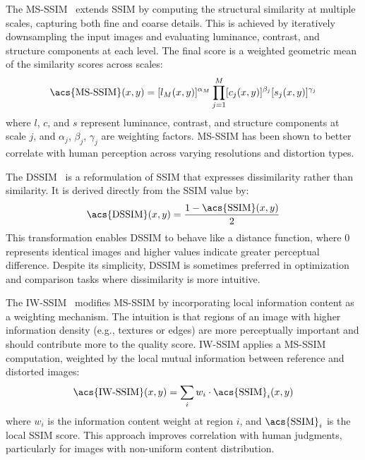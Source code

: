The \acf{MS-SSIM}~\cite{wang2003multiscale} extends \acs{SSIM} by computing the structural similarity at multiple scales, capturing both fine and coarse details. This is achieved by iteratively downsampling the input images and evaluating luminance, contrast, and structure components at each level. The final score is a weighted geometric mean of the similarity scores across scales:
\begin{equation}
\text{\acs{MS-SSIM}}(x, y) = [l_M(x, y)]^{\alpha_M} \prod_{j=1}^{M} [c_j(x, y)]^{\beta_j} [s_j(x, y)]^{\gamma_j}
\end{equation}
where $l$, $c$, and $s$ represent luminance, contrast, and structure components at scale $j$, and $\alpha_j$, $\beta_j$, $\gamma_j$ are weighting factors. \acs{MS-SSIM} has been shown to better correlate with human perception across varying resolutions and distortion types.

The \acf{DSSIM}~\cite{wang2004image} is a reformulation of \acs{SSIM} that expresses dissimilarity rather than similarity. It is derived directly from the \acs{SSIM} value by:
\begin{equation}
\text{\acs{DSSIM}}(x, y) = \frac{1 - \text{\acs{SSIM}}(x, y)}{2}
\end{equation}
This transformation enables \acs{DSSIM} to behave like a distance function, where 0 represents identical images and higher values indicate greater perceptual difference. Despite its simplicity, \acs{DSSIM} is sometimes preferred in optimization and comparison tasks where dissimilarity is more intuitive.

The \acf{IW-SSIM}~\cite{li2011iwssim} modifies \acs{MS-SSIM} by incorporating local information content as a weighting mechanism. The intuition is that regions of an image with higher information density (e.g., textures or edges) are more perceptually important and should contribute more to the quality score. \acs{IW-SSIM} applies a \acs{MS-SSIM} computation, weighted by the local mutual information between reference and distorted images:
\begin{equation}
\text{\acs{IW-SSIM}}(x, y) = \sum_{i} w_i \cdot \text{\acs{SSIM}}_i(x, y)
\end{equation}
where $w_i$ is the information content weight at region $i$, and $\text{\acs{SSIM}}_i$ is the local \acs{SSIM} score. This approach improves correlation with human judgments, particularly for images with non-uniform content distribution.

